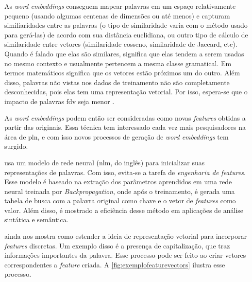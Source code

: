 As \textit{word embeddings} conseguem mapear palavras em um espaço relativamente pequeno (usando algumas centenas de dimensões ou até menos) e capturam similiaridades entre as palavras (o tipo de similaridade varia com o método usado para gerá-las) de acordo com sua distância euclidiana, ou outro tipo de cálculo de similaridade entre vetores (similaridade cosseno, similaridade de Jaccard, etc). Quando é falado que elas são similares, significa que elas tendem a serem usadas no mesmo contexto e usualmente pertencem a mesma classe gramatical. Em termos matemáticos significa que os vetores estão próximos um do outro. Além disso, palavras não vistas nos dados de treinamento não são completamente desconhecidas, pois elas tem uma representação vetorial. Por isso, espera-se que o impacto de palavras \ac{fdv} seja menor \cite{fonseca2015evaluating}.

As \textit{word embeddings} podem então ser consideradas como novas \textit{features} obtidas a partir das originais. Essa técnica tem interessado cada vez mais pesquisadores na área de \ac{pln}, e com isso novos processos de geração de \textit{word embeddings} tem surgido.

 usa um modelo de rede neural (\ac{nlm}, do inglês) para inicializar suas representações de palavras. Com isso, evita-se a tarefa de \textit{engenharia de features}. Esse modelo é baseado na extração dos parâmetros aprendidos em uma rede neural treinada por \textit{Backpropagation}, onde após o treinamento, é gerada uma tabela de busca com a palavra original como chave e o vetor de \textit{features} como valor. Além disso, é mostrado a eficiência desse método em aplicações de análise sintática e semântica.

 ainda nos mostra como estender a ideia de representação vetorial para incorporar \textit{features} discretas. Um exemplo disso é a presença de capitalização, que traz informações importantes da palavra. Esse processo pode ser feito ao criar vetores correspondentes a \textit{feature} criada. A \autoref{fig:exemplofeaturevectors} ilustra esse processo.


